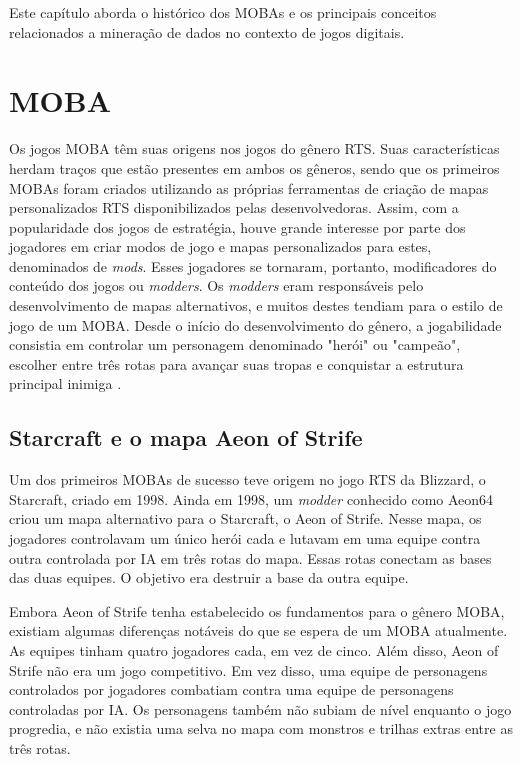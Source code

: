 Este capítulo aborda o histórico dos MOBAs e os principais conceitos relacionados a mineração de dados no contexto de jogos digitais.

\section{MOBA}
Os jogos MOBA têm suas origens nos jogos do gênero RTS. Suas características herdam traços que estão presentes em ambos os gêneros, sendo que os primeiros MOBAs foram criados utilizando as próprias ferramentas de criação de mapas personalizados RTS disponibilizados pelas desenvolvedoras. Assim, com a popularidade dos jogos de estratégia, houve grande interesse por parte dos jogadores em criar modos de jogo e mapas personalizados para estes, denominados de \textit{mods}. Esses jogadores se tornaram, portanto, modificadores do conteúdo dos jogos ou \textit{modders}. Os \textit{modders} eram responsáveis pelo desenvolvimento de mapas alternativos, e muitos destes tendiam para o estilo de jogo de um MOBA. Desde o início do desenvolvimento do gênero, a jogabilidade consistia em controlar um personagem denominado "herói" ou "campeão", escolher entre três rotas para avançar suas tropas e conquistar a estrutura principal inimiga \cite{do2016desenvolvimento} \cite{ferrari2013generative} \cite{minotti2014history}.

\subsection{Starcraft e o mapa Aeon of Strife}
Um dos primeiros MOBAs de sucesso teve origem no jogo RTS da Blizzard, o Starcraft, criado em 1998. Ainda em 1998, um \textit{modder} conhecido como Aeon64 criou um mapa alternativo para o Starcraft, o Aeon of Strife. Nesse mapa, os jogadores controlavam um único herói cada e lutavam em uma equipe contra outra controlada por IA em três rotas do mapa. Essas rotas conectam as bases das duas equipes. O objetivo era destruir a base da outra equipe.

Embora Aeon of Strife tenha estabelecido os fundamentos para o gênero MOBA, existiam algumas diferenças notáveis do que se espera de um MOBA atualmente. As equipes tinham quatro jogadores cada, em vez de cinco. Além disso, Aeon of Strife não era um jogo competitivo. Em vez disso, uma equipe de personagens controlados por jogadores combatiam contra uma equipe de personagens controladas por IA. Os personagens também não subiam de nível enquanto o jogo progredia, e não existia uma selva no mapa com monstros e trilhas extras entre as três rotas.

